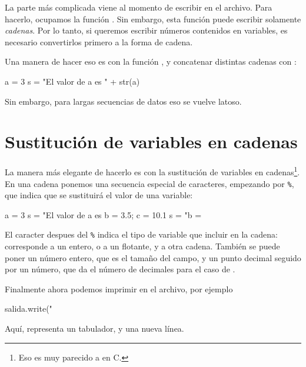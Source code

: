 La parte más complicada viene al momento de escribir en el archivo. Para hacerlo, ocupamos la función .
Sin embargo, esta función puede escribir solamente \emph{cadenas}. Por lo tanto, si queremos escribir números contenidos en variables, es necesario convertirlos primero a la forma de cadena.

Una manera de hacer eso es con la función , y concatenar distintas cadenas con \inl{+}:
\begin{python}
a = 3
s = "El valor de a es " + str(a)
\end{python}
Sin embargo, para largas secuencias de datos eso se vuelve latoso.

\section{Sustitución de variables en cadenas}
La manera más elegante de hacerlo es con la sustitución de variables en cadenas\footnote{Eso es muy parecido a  en C.}. En una cadena ponemos una secuencia especial de caracteres, empezando por \texttt{\%}, que indica que se sustituirá el valor de una variable:
\begin{python}
a = 3
s = "El valor de a es %
b = 3.5; c = 10.1
s = "b = %
\end{python}
El caracter despues del \texttt{\%} indica el tipo de variable que incluir en la cadena:  corresponde a un entero,  o  a un flotante, y  a otra cadena. También se puede poner un número entero, que es el tamaño del campo, y un punto decimal seguido por un número, que da el número de decimales para el caso de .

Finalmente ahora podemos imprimir en el archivo, por ejemplo
\begin{python}
salida.write("%
\end{python}
Aquí, \inl{\t} representa un tabulador, y \inl{\n} una nueva línea.

 











